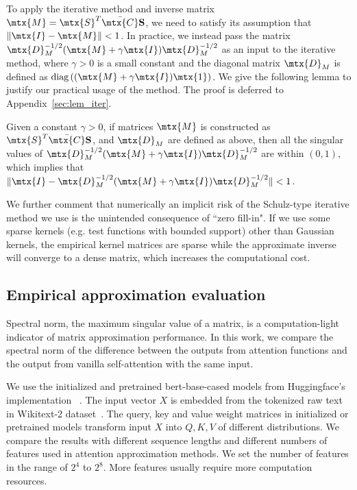 To apply the iterative method and inverse matrix $\mtx{M} = \mtx{S}^{T} \bar{\mtx{C}} \textbf{S}$, we need to satisfy its assumption \citep[Theorem~2]{razavi2014new} that $\|\mtx{I} - \mtx{M}\| < 1$.
In practice, we instead pass the matrix $\mtx{D}_M^{-1/2} (\mtx{M} + \gamma \mtx{I}) \mtx{D}_M^{-1/2}$ as an input to the iterative method,
where $\gamma>0$ is a small constant and the diagonal matrix $\mtx{D}_M$ is defined as $\text{diag}\left( (\mtx{M} + \gamma \mtx{I}) \mtx{1} \right)$.
We give the following lemma to justify our practical usage of the method. The proof is deferred to Appendix~\ref{sec:lem_iter}.
\begin{lem}
\label{lem:iterative}
Given a constant $\gamma > 0$, if matrices $\mtx{M}$ is constructed as $\mtx{S}^{T} \bar{\mtx{C}} \textbf{S}$, and $\mtx{D}_M$ are defined as above,
then all the singular values of $\mtx{D}_M^{-1/2} (\mtx{M} + \gamma \mtx{I}) \mtx{D}_M^{-1/2}$ are within $(0, 1)$,
which implies that $\|\mtx{I} - \mtx{D}_M^{-1/2} (\mtx{M} + \gamma \mtx{I}) \mtx{D}_M^{-1/2}\| < 1$.
\end{lem}
We further comment that numerically an implicit risk of the Schulz-type iterative method we use is the unintended consequence of ``zero fill-in".
If we use some sparse kernels (e.g. test functions with bounded support) other than Gaussian kernels,
the empirical kernel matrices are sparse while the approximate inverse will converge to a dense matrix,
which increases the computational cost.



\subsection{Empirical approximation evaluation}
\label{sec:norm}

Spectral norm, the maximum singular value of a matrix, is a computation-light indicator of matrix approximation performance. 
In this work, we compare the spectral norm of the difference between the outputs from attention functions and the output from vanilla self-attention with the same input.

We use the initialized and pretrained bert-base-cased models from Huggingface's implementation~\citep{DBLP:journals/corr/abs-1910-03771} .
The input vector $X$ is embedded from the tokenized raw text in Wikitext-2 dataset~\citep{DBLP:conf/iclr/MerityX0S17}.
The query, key and value weight matrices in initialized or pretrained models  transform input $X$ into $Q, K, V$ of different distributions.
We compare the results with different sequence lengths and different numbers of features used in attention approximation methods. 
We set the number of features in the range of $2^4$ to $2^8$. 
More features usually require more computation resources.

